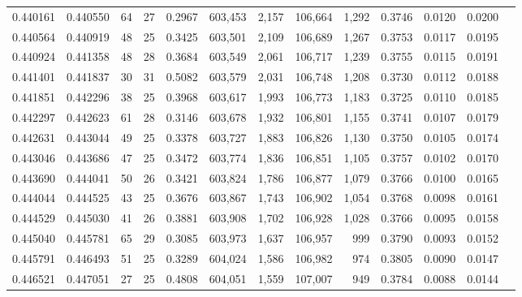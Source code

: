 \begin{tabular}{rrrrrrrrrrrrr}
0.440161 & 0.440550 &    64 &  27 &                                     0.2967 & 603,453 &   2,157 & 106,664 &   1,292 & 0.3746 & 0.0120 & 0.0200 \\
0.440564 & 0.440919 &    48 &  25 &                                     0.3425 & 603,501 &   2,109 & 106,689 &   1,267 & 0.3753 & 0.0117 & 0.0195 \\
0.440924 & 0.441358 &    48 &  28 &                                     0.3684 & 603,549 &   2,061 & 106,717 &   1,239 & 0.3755 & 0.0115 & 0.0191 \\
0.441401 & 0.441837 &    30 &  31 &                                     0.5082 & 603,579 &   2,031 & 106,748 &   1,208 & 0.3730 & 0.0112 & 0.0188 \\
0.441851 & 0.442296 &    38 &  25 &                                     0.3968 & 603,617 &   1,993 & 106,773 &   1,183 & 0.3725 & 0.0110 & 0.0185 \\
0.442297 & 0.442623 &    61 &  28 &                                     0.3146 & 603,678 &   1,932 & 106,801 &   1,155 & 0.3741 & 0.0107 & 0.0179 \\
0.442631 & 0.443044 &    49 &  25 &                                     0.3378 & 603,727 &   1,883 & 106,826 &   1,130 & 0.3750 & 0.0105 & 0.0174 \\
0.443046 & 0.443686 &    47 &  25 &                                     0.3472 & 603,774 &   1,836 & 106,851 &   1,105 & 0.3757 & 0.0102 & 0.0170 \\
0.443690 & 0.444041 &    50 &  26 &                                     0.3421 & 603,824 &   1,786 & 106,877 &   1,079 & 0.3766 & 0.0100 & 0.0165 \\
0.444044 & 0.444525 &    43 &  25 &                                     0.3676 & 603,867 &   1,743 & 106,902 &   1,054 & 0.3768 & 0.0098 & 0.0161 \\
0.444529 & 0.445030 &    41 &  26 &                                     0.3881 & 603,908 &   1,702 & 106,928 &   1,028 & 0.3766 & 0.0095 & 0.0158 \\
0.445040 & 0.445781 &    65 &  29 &                                     0.3085 & 603,973 &   1,637 & 106,957 &     999 & 0.3790 & 0.0093 & 0.0152 \\
0.445791 & 0.446493 &    51 &  25 &                                     0.3289 & 604,024 &   1,586 & 106,982 &     974 & 0.3805 & 0.0090 & 0.0147 \\
0.446521 & 0.447051 &    27 &  25 &                                     0.4808 & 604,051 &   1,559 & 107,007 &     949 & 0.3784 & 0.0088 & 0.0144 \\

\end{tabular}
